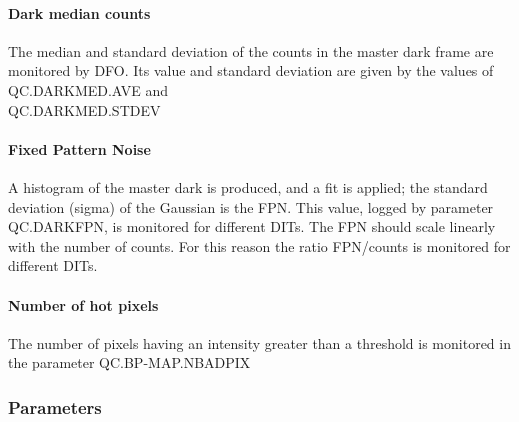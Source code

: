 \paragraph{Dark median counts}
The median and standard deviation of the counts in the master dark frame are
monitored by DFO. Its value and standard deviation are given by the values 
of QC.DARKMED.AVE and \\
QC.DARKMED.STDEV

\paragraph{Fixed Pattern Noise}
A histogram of the master dark is produced, and a fit is applied;
the standard deviation (sigma) of the Gaussian is the FPN. 
This value, logged by parameter QC.DARKFPN, is monitored for different 
DITs. The FPN should scale linearly with the number of counts. For this reason
the ratio FPN/counts is monitored for different DITs.

\paragraph{Number of hot pixels}
The number of pixels having an intensity greater than a threshold is monitored
in the parameter QC.BP-MAP.NBADPIX


\subsubsection{Parameters}


